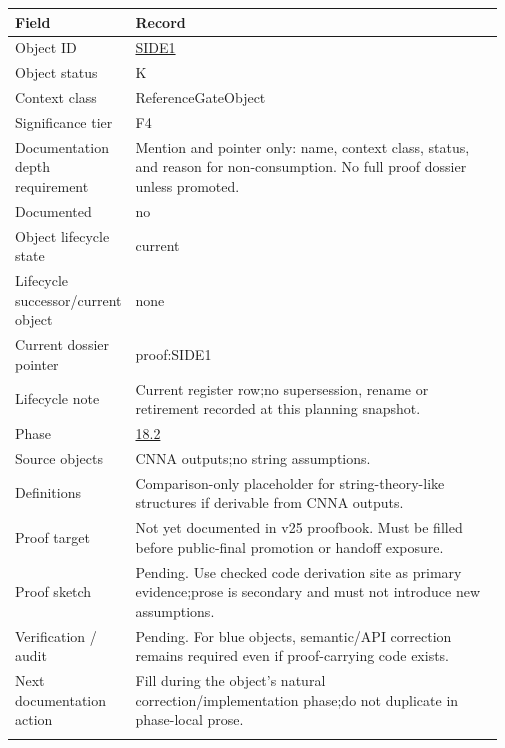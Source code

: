 \begin{longtable}{L{0.16\linewidth} L{0.81\linewidth}}
\hline
\textbf{Field} & \textbf{Record}\\
\hline
Object ID & \hyperlink{object-row-SIDE1}{SIDE1}\\
\hline\addlinespace[0.20em]
Object status & K\\
\hline\addlinespace[0.20em]
Context class & ReferenceGateObject\\
\hline\addlinespace[0.20em]
Significance tier & F4\\
\hline\addlinespace[0.20em]
Documentation depth requirement & Mention and pointer only: name, context class, status, and reason for non-consumption. No full proof dossier unless promoted.\\
\hline\addlinespace[0.20em]
Documented & no\\
\hline\addlinespace[0.20em]
Object lifecycle state & current\\
\hline\addlinespace[0.20em]
Lifecycle successor/\allowbreak{}current object & none\\
\hline\addlinespace[0.20em]
Current dossier pointer & proof:SIDE1\\
\hline\addlinespace[0.20em]
Lifecycle note & Current register row;\newline no supersession, rename or retirement recorded at this planning snapshot.\\
\hline\addlinespace[0.20em]
Phase & \hyperlink{phase-row-18-2}{18.2}\\
\hline\addlinespace[0.20em]
Source objects & CNNA outputs;\newline no string assumptions.\\
\hline\addlinespace[0.20em]
Definitions & Comparison-only placeholder for string-theory-like structures if derivable from CNNA outputs.\\
\hline\addlinespace[0.20em]
Proof target & Not yet documented in v25 proofbook. Must be filled before public-final promotion or handoff exposure.\\
\hline\addlinespace[0.20em]
Proof sketch & Pending. Use checked code derivation site as primary evidence;\newline prose is secondary and must not introduce new assumptions.\\
\hline\addlinespace[0.20em]
Verification /\allowbreak{} audit & Pending. For blue objects, semantic/\allowbreak{}API correction remains required even if proof-carrying code exists.\\
\hline\addlinespace[0.20em]
Next documentation action & Fill during the object's natural correction/\allowbreak{}implementation phase;\newline do not duplicate in phase-local prose.\\
\hline\addlinespace[0.20em]
\end{longtable}
